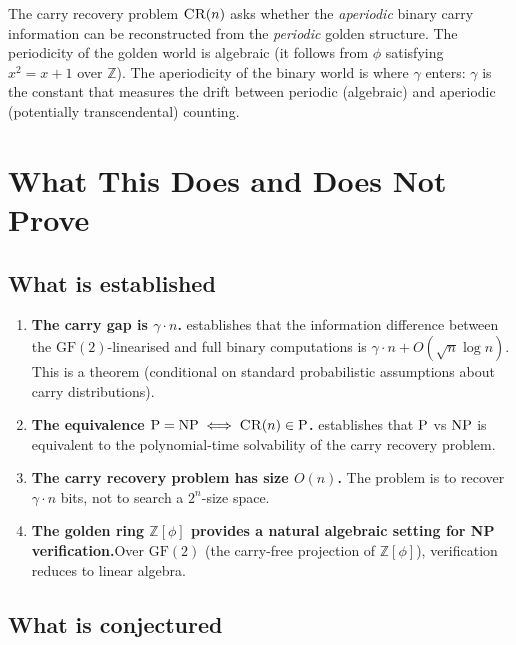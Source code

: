 \documentclass[12pt, a4paper]{article}
\theoremstyle{plain}
\theoremstyle{definition}
\theoremstyle{remark}
\newcommand{\Z}{\mathbb{Z}}
\newcommand{\GF}{\mathrm{GF}}
\newcommand{\NP}{\textup{NP}}
\newcommand{\PP}{\textup{P}}
\newcommand{\Zphi}{\Z[\phi]}
\begin{document}
The carry recovery problem $\textsc{CR}(n)$ asks whether the
\emph{aperiodic} binary carry information can be reconstructed from
the \emph{periodic} golden structure.  The periodicity of the golden
world is algebraic (it follows from $\phi$ satisfying $x^2 = x + 1$
over $\Z$).  The aperiodicity of the binary world is where $\gamma$
enters: $\gamma$ is the constant that measures the drift between
periodic (algebraic) and aperiodic (potentially transcendental)
counting.

\section{What This Does and Does Not Prove}
\label{sec:honesty}

\subsection{What is established}

\begin{enumerate}[nosep]
  \item \textbf{The carry gap is $\gamma \cdot n$.}\quad
         establishes that the information
        difference between the $\GF(2)$-linearised and full binary
        computations is $\gamma \cdot n + O(\sqrt{n}\log n)$.  This
        is a theorem (conditional on standard probabilistic
        assumptions about carry distributions).

  \item \textbf{The equivalence $\PP = \NP \iff \textsc{CR}(n) \in
        \PP$.}\quad {} establishes that $\PP$ vs $\NP$
        is equivalent to the polynomial-time solvability of the carry
        recovery problem.

  \item \textbf{The carry recovery problem has size $O(n)$.}\quad
        The problem is to recover $\gamma \cdot n$ bits, not to
        search a $2^n$-size space.

  \item \textbf{The golden ring $\Zphi$ provides a natural
        algebraic setting for NP verification.}\quad Over $\GF(2)$
        (the carry-free projection of $\Zphi$), verification reduces
        to linear algebra.
\end{enumerate}

\subsection{What is conjectured}
\end{document}
